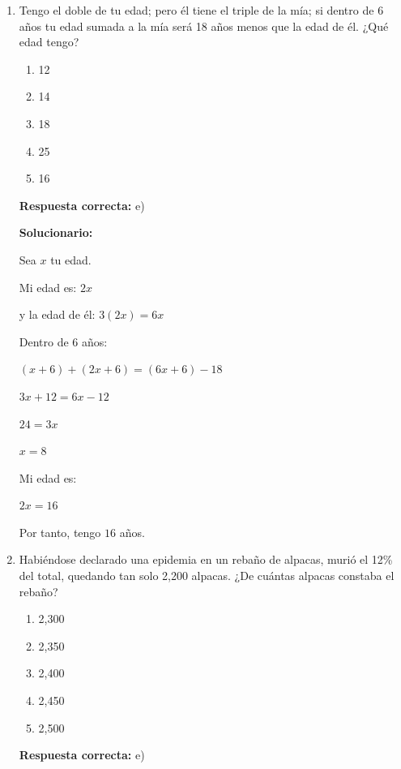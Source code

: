 \begin{enumerate}[resume]
	$7 \times 4 = 28$
	
	Entonces:
	
	$40 \times 28 = 1,120$
	
	Por tanto, la cantidad total de maneras es \(\boxed{1,120}\)
	
	\vspace{6mm}
	
	\item Tengo el doble de tu edad; pero él tiene el triple de la mía; si dentro de 6 años tu edad sumada a la mía será 18 años menos que la edad de él. ¿Qué edad tengo?
	\begin{enumerate}[label=\alph*)]
		\item 12
		\item 14
		\item 18
		\item 25
		\item 16
	\end{enumerate}
	\textbf{Respuesta correcta:} e)
	
	\vspace{2mm}
	\textbf{Solucionario:}
	
	Sea \(x\) tu edad. 
	
	Mi edad es: $2x$
	
	y la edad de él: $3(2x)=6x$
	
	Dentro de 6 años:
	
	$(x+6)+(2x+6)=(6x+6)-18$
	
	$3x+12=6x-12$
	
	$24=3x$
	
	$x=8$
	
	Mi edad es:
	
	$2x=16$
	
	Por tanto, tengo \(\boxed{16}\) años.
	
	\vspace{6mm}
	
	\item Habiéndose declarado una epidemia en un rebaño de alpacas, murió el 12\% del total, quedando tan solo 2,200 alpacas. ¿De cuántas alpacas constaba el rebaño?
	\begin{enumerate}[label=\alph*)]
		\item 2,300
		\item 2,350
		\item 2,400
		\item 2,450
		\item 2,500
	\end{enumerate}
	\textbf{Respuesta correcta:} e)
	

\end{enumerate}
